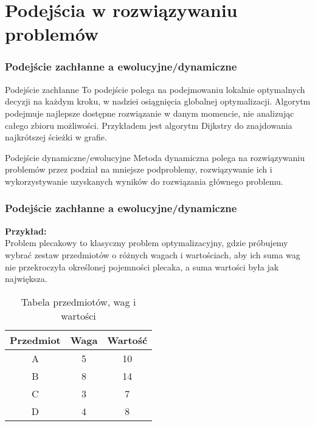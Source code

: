 \documentclass{beamer}
\begin{document}
\section{Podejścia w rozwiązywaniu problemów}
\begin{frame}
    \frametitle{Podejście zachłanne a ewolucyjne/dynamiczne}
    \begin{block}{Podejście zachłanne}
        To podejście polega na podejmowaniu lokalnie optymalnych decyzji na każdym kroku, w nadziei osiągnięcia globalnej optymalizacji. Algorytm podejmuje najlepsze dostępne rozwiązanie w danym momencie, nie analizując całego zbioru możliwości. Przykładem jest algorytm Dijkstry do znajdowania najkrótszej ścieżki w grafie.
    \end{block}
    \begin{block}{Podejście dynamiczne/ewolucyjne}
        Metoda dynamiczna polega na rozwiązywaniu problemów przez podział na mniejsze podproblemy, rozwiązywanie ich i wykorzystywanie uzyskanych wyników do rozwiązania głównego problemu.
    \end{block}
\end{frame}
\begin{frame}
    \frametitle{Podejście zachłanne a ewolucyjne/dynamiczne}
    \textbf{Przykład:} \\
    Problem plecakowy to klasyczny problem optymalizacyjny, gdzie próbujemy wybrać zestaw przedmiotów o różnych wagach i wartościach, aby ich suma wag nie przekroczyła określonej pojemności plecaka, a suma wartości była jak największa.
    \begin{table}[htbp]
        \centering
        \caption{Tabela przedmiotów, wag i wartości}
        \begin{tabular}{ccc}
            \toprule
            Przedmiot & Waga & Wartość \\
            \midrule
            A & 5 & 10 \\
            B & 8 & 14 \\
            C & 3 & 7 \\
            D & 4 & 8 \\
            \bottomrule
        \end{tabular}
        \label{tab:tabela_przedmiotow}
    \end{table}
\end{frame}
\end{document}
